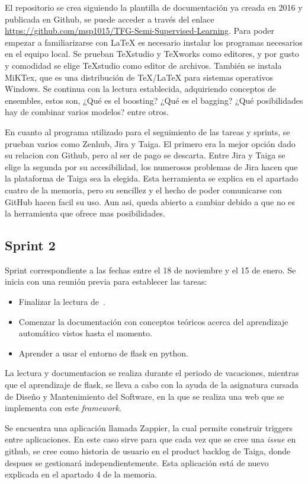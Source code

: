 El repositorio se crea siguiendo la plantilla de documentación ya creada en 2016 y publicada en Github, se puede acceder a través del enlace \url{https://github.com/msp1015/TFG-Semi-Supervised-Learning}. Para poder empezar a familiarizarse con \LaTeX{} es necesario instalar los programas necesarios en el equipo local. Se prueban TeXstudio y TeXworks como editores, y por gusto y comodidad se elige TeXstudio como editor de archivos. También se instala MiKTex, que es una distribución de TeX/\LaTeX{} para sistemas operativos Windows.
Se continua con la lectura establecida, adquiriendo conceptos de ensembles, estos son, ¿Qué es el boosting? ¿Qué es el bagging? ¿Qué posibilidades hay de combinar varios modelos? entre otros.

En cuanto al programa utilizado para el seguimiento de las tareas y sprints, se prueban varios como Zenhub, Jira y Taiga. El primero era la mejor opción dado su relacion con Github, pero al ser de pago se descarta. Entre Jira y Taiga se elige la segunda por su accesibilidad, los numerosos problemas de Jira hacen que la plataforma de Taiga sea la elegida.
Esta herramienta se explica en el apartado cuatro de la memoria, pero su sencillez y el hecho de poder comunicarse con GitHub hacen facil su uso. Aun asi, queda abierto a cambiar debido a que no es la herramienta que ofrece mas posibilidades.
\subsection{Sprint 2}
Sprint correspondiente a las fechas entre el 18 de noviembre y el 15 de enero. Se inicia con una reunión previa para establecer las tareas: 
\begin{itemize}
	\item Finalizar la lectura de~\cite{ensembles}.
	\item Comenzar la documentación con conceptos teóricos acerca del aprendizaje automático vistos hasta el momento.
	\item  Aprender a usar el entorno de flask en python.
\end{itemize}

La lectura y documentacion se realiza durante el periodo de vacaciones, mientras que el aprendizaje de flask, se lleva a cabo con la ayuda de la asignatura cursada de Diseño y Mantenimiento del Software, en la que se realiza una web que se implementa con este \textit{framework}.

Se encuentra una aplicación llamada Zappier, la cual permite construir triggers entre aplicaciones. En este caso sirve para que cada vez que se cree una \textit{issue} en github, se cree como historia de usuario en el product backlog de Taiga, donde despues se gestionará independientemente. Esta aplicación está de nuevo explicada en el apartado 4 de la memoria. 
